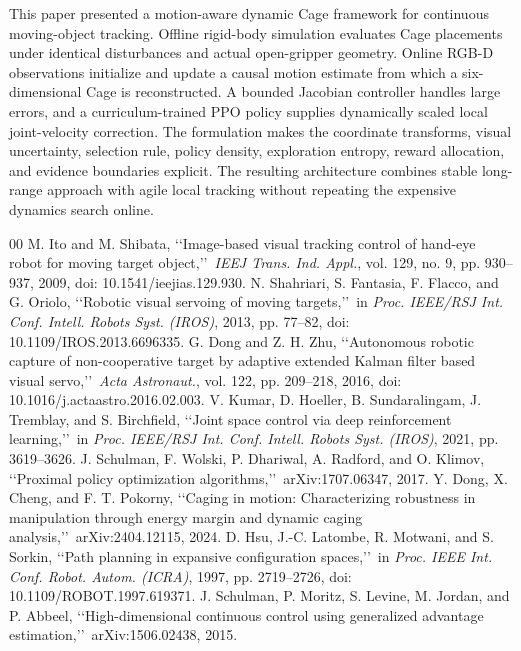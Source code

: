 \documentclass[conference]{IEEEtran}
\begin{document}
This paper presented a motion-aware dynamic Cage framework for continuous moving-object tracking. Offline rigid-body simulation evaluates Cage placements under identical disturbances and actual open-gripper geometry. Online RGB-D observations initialize and update a causal motion estimate from which a six-dimensional Cage is reconstructed. A bounded Jacobian controller handles large errors, and a curriculum-trained PPO policy supplies dynamically scaled local joint-velocity correction. The formulation makes the coordinate transforms, visual uncertainty, selection rule, policy density, exploration entropy, reward allocation, and evidence boundaries explicit. The resulting architecture combines stable long-range approach with agile local tracking without repeating the expensive dynamics search online.

\begin{thebibliography}{00}
M. Ito and M. Shibata, \lq\lq Image-based visual tracking control of hand-eye robot for moving target object,\rq\rq\ \emph{IEEJ Trans. Ind. Appl.}, vol. 129, no. 9, pp. 930--937, 2009, doi: 10.1541/ieejias.129.930.
N. Shahriari, S. Fantasia, F. Flacco, and G. Oriolo, \lq\lq Robotic visual servoing of moving targets,\rq\rq\ in \emph{Proc. IEEE/RSJ Int. Conf. Intell. Robots Syst. (IROS)}, 2013, pp. 77--82, doi: 10.1109/IROS.2013.6696335.
G. Dong and Z. H. Zhu, \lq\lq Autonomous robotic capture of non-cooperative target by adaptive extended Kalman filter based visual servo,\rq\rq\ \emph{Acta Astronaut.}, vol. 122, pp. 209--218, 2016, doi: 10.1016/j.actaastro.2016.02.003.
V. Kumar, D. Hoeller, B. Sundaralingam, J. Tremblay, and S. Birchfield, \lq\lq Joint space control via deep reinforcement learning,\rq\rq\ in \emph{Proc. IEEE/RSJ Int. Conf. Intell. Robots Syst. (IROS)}, 2021, pp. 3619--3626.
J. Schulman, F. Wolski, P. Dhariwal, A. Radford, and O. Klimov, \lq\lq Proximal policy optimization algorithms,\rq\rq\ arXiv:1707.06347, 2017.
Y. Dong, X. Cheng, and F. T. Pokorny, \lq\lq Caging in motion: Characterizing robustness in manipulation through energy margin and dynamic caging analysis,\rq\rq\ arXiv:2404.12115, 2024.
D. Hsu, J.-C. Latombe, R. Motwani, and S. Sorkin, \lq\lq Path planning in expansive configuration spaces,\rq\rq\ in \emph{Proc. IEEE Int. Conf. Robot. Autom. (ICRA)}, 1997, pp. 2719--2726, doi: 10.1109/ROBOT.1997.619371.
J. Schulman, P. Moritz, S. Levine, M. Jordan, and P. Abbeel, \lq\lq High-dimensional continuous control using generalized advantage estimation,\rq\rq\ arXiv:1506.02438, 2015.

\end{thebibliography}
\end{document}

